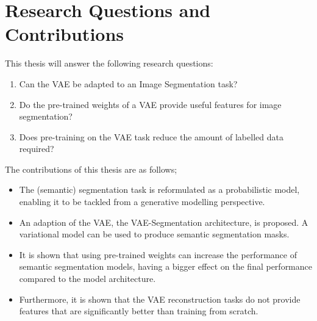\section{Research Questions and Contributions}
This thesis will answer the following research questions:
\begin{enumerate}
    \item Can the VAE be adapted to an Image Segmentation task?
    \item Do the pre-trained weights of a VAE provide useful features for image segmentation?
    \item Does pre-training on the VAE task reduce the amount of labelled data required?
\end{enumerate}
The contributions of this thesis are as follows;
\begin{itemize}
    \item The (semantic) segmentation task is reformulated as a probabilistic model, enabling it to be tackled from a generative modelling perspective.
    \item An adaption of the VAE, the VAE-Segmentation architecture, is proposed. A variational model can be used to produce semantic segmentation masks.
    \item It is shown that using pre-trained weights can increase the performance of semantic segmentation models, having a bigger effect on the final performance compared to the model architecture.
    \item  Furthermore, it is shown that the VAE reconstruction tasks do not provide features that are significantly better than training from scratch.
\end{itemize}

